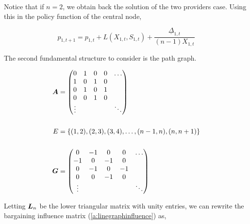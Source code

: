 Notice that if $n = 2$, we obtain back the solution of the two providers case. Using this in the policy function of the central node,

\begin{equation} \label{policy_star}
  p_{1, t+1} = p_{1, t} + L(X_{1, t}, S_{1, t}) + \frac{\underline{\Delta}_{1, t}}{(n-1) X_{1, t}}
\end{equation}

The second fundamental structure to consider is the path graph.

\vspace{5mm}
\begin{minipage}{.5\textwidth}
  \resizebox{\textwidth}{!}{}
\end{minipage}
\begin{minipage}{.5\textwidth}
  \begin{equation*}
    \begin{split}
      \matr{A} &= \begin{pmatrix}
        0      & 1 & 0 & 0 & \ldots \\
        1      & 0 & 1 & 0 &        \\
        0      & 1 & 0 & 1 &        \\
        0      & 0 & 1 & 0 &        \\
        \vdots &   &   &   & \ddots
      \end{pmatrix} \\
      \vspace{5mm} \\
      E &= \set{(1, 2), (2, 3), (3, 4), \ldots, (n-1, n), (n, n+1)} \\
      \vspace{5mm} \\
      \G &= \begin{pmatrix}
        0      & -1 & 0  & 0  & \ldots \\
        -1     & 0  & -1 & 0  &        \\
        0      & -1 & 0  & -1 &        \\
        0      & 0  & -1 & 0  &        \\
        \vdots &    &    &    & \ddots
      \end{pmatrix}
    \end{split}
  \end{equation*}
\end{minipage}
\vspace{5mm}

Letting $\bm{L}_n$ be the lower triangular matrix with unity entries, we can rewrite the bargaining influence matrix (\ref{a:linegraphinfluence}) as,

